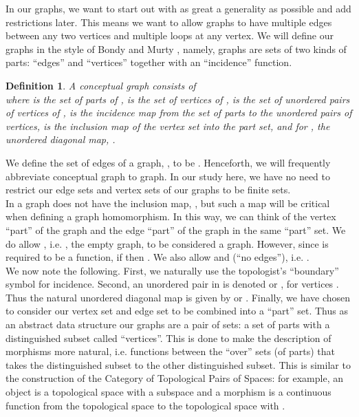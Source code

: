 \documentclass[11pt]{article}
\newtheorem{definition}[theorem]{Definition}
\begin{document}
\indent In our graphs, we want to start out with as great a generality as possible and add restrictions later. This means we want to allow graphs to have multiple edges between any two vertices and multiple loops at any vertex. We will define our graphs in the style of Bondy and Murty \cite{Bondy}, namely, graphs are sets of two kinds of parts: ``edges'' and ``vertices'' together with an ``incidence'' function. 
\begin{definition}
A \emph{conceptual graph}  consists of\\
 where  is the set of parts of ,  is the set of vertices of ,  is the set of unordered pairs of vertices of ,  is the incidence map from the set of parts to the unordered pairs of vertices,  is the inclusion map of the vertex set into the part set, and for , the unordered diagonal map, .
\end{definition}
\indent We define the set of edges of a graph, , to be . Henceforth, we will frequently abbreviate conceptual graph to graph. In our study here, we have no need to restrict our edge sets and vertex sets of our graphs to be finite sets.\\
\indent In \cite{Bondy} a graph does not have the inclusion map, , but such a map will be critical when defining a graph homomorphism. In this way, we can think of the vertex ``part'' of the graph and the edge ``part'' of the graph in the same ``part'' set. We do allow , i.e. , the empty graph, to be considered a graph. However, since  is required to be a function, if  then . We also allow  and  (``no edges''), i.e. .\\
\indent We now note the following. First, we naturally use the topologist's ``boundary'' symbol for incidence. Second, an unordered pair in  is denoted \textunderscore or \textunderscore, for vertices . Thus the natural unordered diagonal map  is given by \textunderscore or \textunderscore. Finally, we have chosen to consider our vertex set and edge set to be combined into a ``part'' set. Thus as an abstract data structure our graphs are a pair of sets: a set of parts with a distinguished subset called ``vertices''. This is done to make the description of morphisms more natural, i.e. functions between the ``over'' sets (of parts) that takes the distinguished subset to the other distinguished subset. This is similar to the construction of the Category of Topological Pairs of Spaces: for example, an object  is a topological space  with a subspace  and a morphism  is a continuous function from the topological space  to the topological space  with .\\
\end{document}
